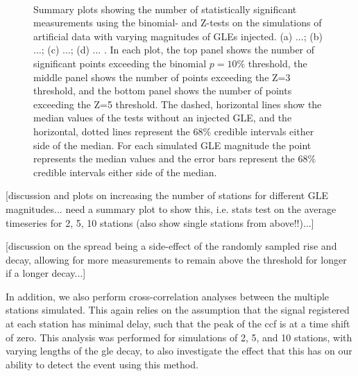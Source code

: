 \begin{figure}[!htbp!]
	 \\
	
	\caption{Summary plots showing the number of statistically significant measurements using the binomial- and Z-tests on the simulations of artificial data with varying magnitudes of GLEs injected. (a) ...; (b) ...; (c) ...; (d) ... . In each plot, the top panel shows the number of significant points exceeding the binomial $p = 10 \%$ threshold, the middle panel shows the number of points exceeding the Z=3 threshold, and the bottom panel shows the number of points exceeding the Z=5 threshold. The dashed, horizontal lines show the median values of the tests without an injected GLE, and the horizontal, dotted lines represent the $68 \%$ credible intervals either side of the median. For each simulated GLE magnitude the point represents the median values and the error bars represent the $68 \%$ credible intervals either side of the median.}
	\label{fig:multi_HS14008_sims}
\end{figure}

[discussion and plots on increasing the number of stations for different GLE magnitudes... need a summary plot to show this, i.e. stats test on the average timeseries for 2, 5, 10 stations (also show single stations from above!!)...]

[discussion on the spread being a side-effect of the randomly sampled rise and decay, allowing for more measurements to remain above the threshold for longer if a longer decay...]

In addition, we also perform cross-correlation analyses between the multiple stations simulated. This again relies on the assumption that the signal registered at each station has minimal delay, such that the peak of the \gls{ccf} is at a time shift of zero. This analysis was performed for simulations of 2, 5, and 10 stations, with varying lengths of the \gls{gle} decay, to also investigate the effect that this has on our ability to detect the event using this method.

